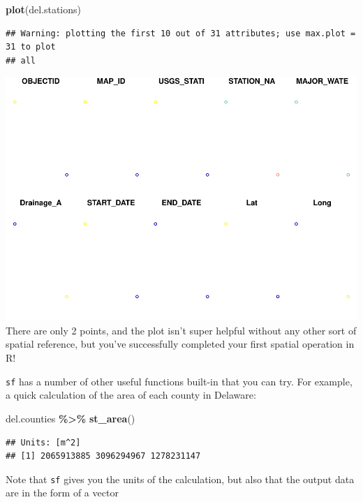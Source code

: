 \documentclass[]{article}
\newenvironment{Shaded}{\begin{snugshade}}{\end{snugshade}}
\newcommand{\FunctionTok}[1]{\textcolor[rgb]{0.13,0.29,0.53}{\textbf{#1}}}
\newcommand{\NormalTok}[1]{#1}
\newcommand{\SpecialCharTok}[1]{\textcolor[rgb]{0.81,0.36,0.00}{\textbf{#1}}}
\begin{document}
\begin{Shaded}
\begin{Highlighting}[]
\FunctionTok{plot}\NormalTok{(del.stations)}
\end{Highlighting}
\end{Shaded}

\begin{verbatim}
## Warning: plotting the first 10 out of 31 attributes; use max.plot = 31 to plot
## all
\end{verbatim}

\includegraphics{lab01_files/figure-latex/mypoints-1.pdf} There are only
2 points, and the plot isn't super helpful without any other sort of
spatial reference, but you've successfully completed your first spatial
operation in R!

\texttt{sf} has a number of other useful functions built-in that you can
try. For example, a quick calculation of the area of each county in
Delaware:

\begin{Shaded}
\begin{Highlighting}[]
\NormalTok{del.counties }\SpecialCharTok{\%\textgreater{}\%} \FunctionTok{st\_area}\NormalTok{() }
\end{Highlighting}
\end{Shaded}

\begin{verbatim}
## Units: [m^2]
## [1] 2065913885 3096294967 1278231147
\end{verbatim}

Note that \texttt{sf} gives you the units of the calculation, but also
that the output data are in the form of a vector
\end{document}
